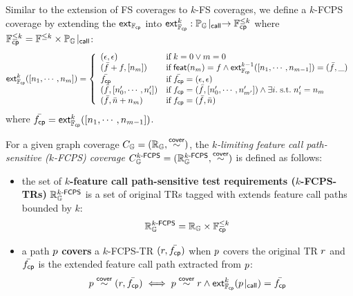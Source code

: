 Similar to the extension of FS coverages to $k$-FS coverages, we define a
$k$-FCPS coverage by extending the $\textsf{ext}_{\mathbb{F}_{\textsf{cp}}}$ into $\textsf{ext}_{\mathbb{F}_{\textsf{cp}}}^{k}:
{\mathbb{P}_{\mathbb{G}}}\!\mid_{\textsf{call}} \rightarrow \mathbb{F}_{\textsf{cp}}^{\leq k}$ where $\mathbb{F}_{\textsf{cp}}^{\leq k} =
\mathbb{F}^{\leq k} \times {\mathbb{P}_{\mathbb{G}}}\!\mid_{\textsf{call}}$:
%
\begin{equation}\label{equ:extfcps}
  \textsf{ext}_{\mathbb{F}_{\textsf{cp}}}^{k}([n_1, \cdots, n_m]) = \left\{
    \begin{array}{ll}
      (\epsilon, \epsilon) & \text{if} \; k = 0 \vee m = 0\\

      (\bar{f} + f, [n_m]) & \text{if} \; \textsf{feat}(n_m) = f \wedge
      \textsf{ext}_{\mathbb{F}_{\textsf{cp}}}^{k-1}([n_1, \cdots, n_{m-1}]) = (\bar{f}, \_)\\

      \bar{f_{\textsf{cp}}} & \text{if} \; \bar{f_{\textsf{cp}}} = (\epsilon, \epsilon)\\

      (\bar{f}, [n'_0, \cdots, n'_i]) &
      \text{if} \; f_{\textsf{cp}} = (\bar{f}, [n'_0, \cdots, n'_{m'}]) \wedge
      \exists i. {\; \text{s.t.} \; } n'_i = n_m\\

      (\bar{f}, \bar{n} + n_m) & \text{if} \; f_{\textsf{cp}} = (\bar{f}, \bar{n})\\
    \end{array}
  \right.
\end{equation}
%
where $\bar{f_{\textsf{cp}}} = \textsf{ext}_{\mathbb{F}_{\textsf{cp}}}^{k}([n_1, \cdots, n_{m-1}])$.


\begin{definition}\label{def:k-fcps-cov}
  For a given graph coverage $C_{\mathbb{G}} = (\mathbb{R}_{\mathbb{G}}, \overset{\textsf{cover}}{\sim})$, the
  \textit{$k$-limiting feature call path-sensitive ($k$-FCPS) coverage}
  $C_{\mathbb{G}}^{{k}\textsf{-FCPS}} = (\mathbb{R}_{\mathbb{G}}^{{k}\textsf{-FCPS}}, \overset{\textsf{cover}}{\sim})$ is defined as follows:
  \begin{itemize}
    \item the set of \textbf{$k$-feature call path-sensitive test requirements
      ($k$-FCPS-TRs)} $\mathbb{R}_{\mathbb{G}}^{{k}\textsf{-FCPS}}$ is a set of original TRs tagged
      with extends feature call paths bounded by $k$:
      \[
        \mathbb{R}_{\mathbb{G}}^{{k}\textsf{-FCPS}} = \mathbb{R}_{\mathbb{G}} \times \mathbb{F}_{\textsf{cp}}^{\leq k}
      \]
    \item a path $p$ \textbf{covers} a $k$-FCPS-TR $(r, \bar{f_{\textsf{cp}}})$ when $p$
      covers the original TR $r$ and $\bar{f_{\textsf{cp}}}$ is the extended feature call path
      extracted from $p$:
      \[
        p \overset{\textsf{cover}}{\sim} (r, \bar{f_{\textsf{cp}}}) \iff p \overset{\textsf{cover}}{\sim} r \wedge
        \textsf{ext}_{\mathbb{F}_{\textsf{cp}}}^{k}({p}\!\mid_{\textsf{call}}) = \bar{f_{\textsf{cp}}}
      \]
  \end{itemize}
\end{definition}

